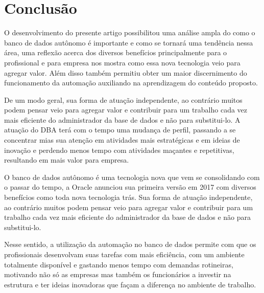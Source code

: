 \chapter{Conclusão}

O desenvolvimento do presente artigo possibilitou uma análise ampla do como o banco de dados autônomo é importante e como se tornará uma tendência nessa área, uma reflexão acerca dos diversos benefícios principalmente para o profissional e para empresa nos mostra como essa nova tecnologia veio para agregar valor. Além disso também permitiu obter um maior discernimento do funcionamento da automação auxiliando na aprendizagem do conteúdo proposto.

De um modo geral, sua forma de atuação independente, ao contrário muitos podem pensar veio para agregar valor e contribuir para um trabalho cada vez mais eficiente do administrador da base de dados e não para substitui-lo. A atuação do DBA terá com o tempo uma mudança de perfil, passando a se concentrar mias sua atenção em atividades mais estratégicas e em ideias de inovação e perdendo menos tempo com atividades maçantes e repetitivas, resultando em mais valor para empresa.

O banco de dados autônomo é uma tecnologia nova que vem se consolidando com o passar do tempo, a Oracle anunciou sua primeira versão em 2017 com diversos benefícios como toda nova tecnologia trás. Sua forma de atuação independente, ao contrário muitos podem pensar veio para agregar valor e contribuir para um trabalho cada vez mais eficiente do administrador da base de dados e não para substitui-lo.

Nesse sentido, a utilização da automação no banco de dados permite com que os profissionais desenvolvam suas tarefas com mais eficiência, com um ambiente totalmente disponível e gastando menos tempo com demandas rotineiras, motivando não só as empresas mas também os funcionários a investir na estrutura e ter ideias inovadoras que façam a diferença no ambiente de trabalho.
